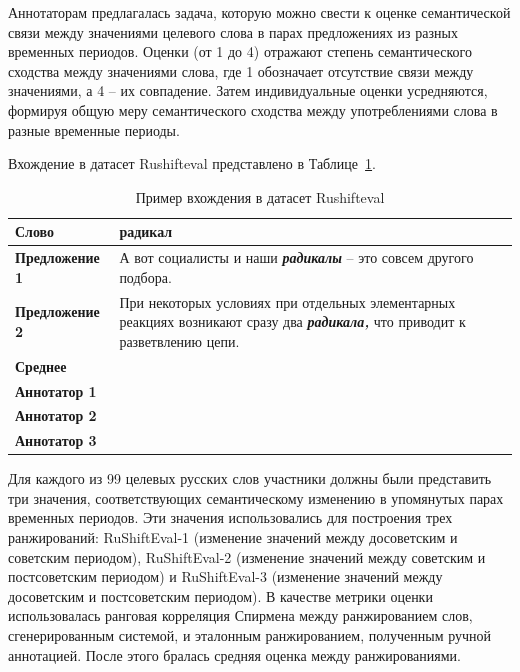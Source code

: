 \documentclass[LI,VKR]{HSEUniversity}
\begin{document}
Аннотаторам предлагалась задача, которую можно свести к оценке семантической связи между значениями
целевого слова в парах предложениях из разных временных периодов.
Оценки (от 1 до 4) отражают степень семантического сходства между значениями слова, где
1 обозначает отсутствие связи между значениями, а 4 – их совпадение.
Затем индивидуальные оценки усредняются, формируя общую меру семантического сходства между
употреблениями слова в разные временные периоды.

Вхождение в датасет Rushifteval представлено в Таблице~\ref{tab:Пример вхождения в датасет Rushifteval}.

\begin{table}[H]
\centering
\caption{Пример вхождения в датасет Rushifteval}
\label{tab:Пример вхождения в датасет Rushifteval}
\begin{tabular}{|>{\raggedright\arraybackslash}p{4cm}|>{\raggedright\arraybackslash}p{10cm}|}
\hline
\textbf{Слово} & радикал \\
\hline
\textbf{Предложение 1} & А вот социалисты и наши \textbf{\textit{радикалы}} – это совсем другого подбора. \\
\hline
\textbf{Предложение 2} & При некоторых условиях при отдельных элементарных реакциях возникают сразу два \textbf{\textit{радикала,}} что приводит к разветвлению цепи. \\
\hline
\textbf{Среднее} & 1.0 \\
\hline
\textbf{Аннотатор 1} & 1 \\
\hline
\textbf{Аннотатор 2} & 1 \\
\hline
\textbf{Аннотатор 3} & 1 \\
\hline
\end{tabular}
\end{table}

Для каждого из 99 целевых русских слов участники должны
были представить три значения, соответствующих семантическому изменению в упомянутых парах
временных периодов.
Эти значения использовались для построения трех ранжирований:
RuShiftEval-1 (изменение значений между досоветским и советским периодом),
RuShiftEval-2 (изменение значений между советским и постсоветским периодом)
и RuShiftEval-3 (изменение значений между досоветским и постсоветским периодом).
В качестве метрики оценки использовалась ранговая корреляция Спирмена между ранжированием слов,
сгенерированным системой, и эталонным ранжированием, полученным ручной аннотацией.
После этого бралась средняя оценка между ранжированиями.
\end{document}
